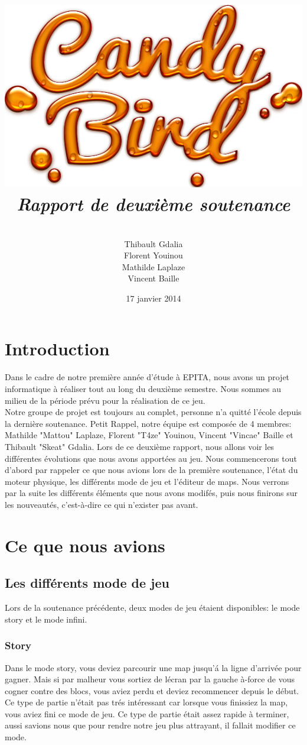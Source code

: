 \documentclass [11pt]{report}
\title{
	\includegraphics[scale=0.43]{images/Logojeu.png}
	 \\\vspace{20mm}
	\textbf{\Huge \itshape Rapport de deuxi\`eme soutenance  }
	}
\author{ \\\vspace{2mm}
	Thibault Gdalia\\\vspace{2mm}
	Florent Youinou\\\vspace{2mm}
	Mathilde Laplaze\\\vspace{2mm}
	Vincent Baille \\\vspace{30mm}
	}
\date{17 janvier 2014}
\begin{document}
\thispagestyle{fancy}
\renewcommand{\baselinestretch}{0.001}
\maketitle
\tableofcontents
\chapter*{Introduction} 
Dans le cadre de notre premi\`ere ann\'ee d'\'etude \`a EPITA, nous avons un projet informatique \`a r\'ealiser tout au long du deuxi\`eme semestre. Nous sommes au milieu de la p\'eriode pr\'evu pour la r\'ealisation de ce jeu. \\

Notre groupe de projet est toujours au complet, personne n'a quitt\'e l'\'ecole depuis la derni\`ere soutenance. Petit Rappel, notre \'equipe est compos\'ee de 4 membres: Mathilde "Mattou" Laplaze, Florent "T4ze" Youinou, Vincent "Vincae" Baille et Thibault "Skeat" Gdalia. Lors de ce deuxi\`eme rapport, nous allons voir les diff\'erentes \'evolutions que nous avons apport\'ees au jeu. Nous commencerons tout d'abord par rappeler ce que nous avions lors de la premi\`ere soutenance, l'\'etat du moteur physique, les diff\'erents mode de jeu et l'\'editeur de maps. Nous verrons par la suite les diff\'erents \'el\'ements que nous avons modif\'es, puis nous finirons sur les nouveaut\'es, c'est-\`a-dire ce qui n'exister pas avant.

\chapter{Ce que nous avions}
	\section{Les diff\'erents mode de jeu}
		Lors de la soutenance pr\'ec\'edente, deux modes de jeu \'etaient disponibles: le mode story et le mode infini.
		\subsection{Story}
			Dans le mode story, vous deviez parcourir une map jusqu'\'a la ligne d'arriv\'ee pour gagner. Mais si par malheur vous sortiez de l\'ecran par la gauche \`a-force de vous cogner contre des blocs, vous aviez perdu et deviez recommencer depuis le d\'ebut. Ce type de partie n'\'etait pas tr\'es int\'eressant car lorsque vous finissiez la map, vous aviez fini ce mode de jeu. Ce type de partie \'etait assez rapide \`a terminer, aussi savions nous que pour rendre notre jeu plus attrayant, il fallait modifier ce mode. \\
\end{document}
